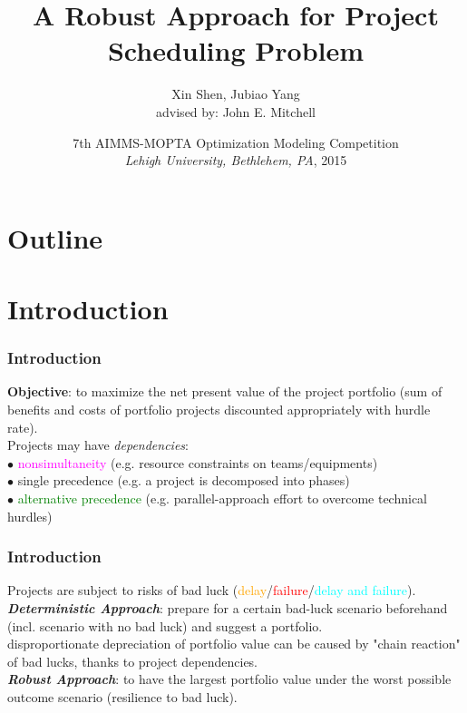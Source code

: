 \documentclass{beamer}
\title[Robust Scheduling]{A Robust Approach for Project Scheduling Problem}
\author[Shen, Yang]{Xin Shen, Jubiao Yang\\{\small advised by: John E. Mitchell}}
\institute[RPI]{ 
Rensselaer Polytechnic Institute  \\
Troy,  NY  12180}
\date[MOPTA 2015]{7th AIMMS-MOPTA Optimization Modeling Competition\\\textit{Lehigh University, Bethlehem, PA}, 2015}
\newcommand{\torange}{\textcolor{orange}}
\newcommand{\tred}{\textcolor{red}}
\newcommand{\tmag}{\textcolor{magenta}}
\newcommand{\tgreen}{\textcolor{green}}
\newcommand{\tcyan}{\textcolor{cyan}}
\newcommand{\tcam}{\textcolor{blue!40}}
\begin{document}
	

	\begin{frame}
		\titlepage
	\end{frame}

	\section*{Outline} 
		\begin{frame}[allowframebreaks]
			\tableofcontents 
		\end{frame}

	\section{Introduction}
		\begin{frame}
			\frametitle{Introduction}
			\textbf{Objective}: to maximize the net present value of the project portfolio (sum of benefits and costs of portfolio projects discounted appropriately with hurdle rate).\\
			\bigskip
			Projects may have \textit{dependencies}:\\
			\smallskip
			$\bullet$ \tmag{nonsimultaneity} (e.g. resource constraints on teams/equipments)\\
			\smallskip
			$\bullet$ \tcam{single precedence} (e.g. a project is decomposed into phases)\\
			\smallskip
			$\bullet$ \tgreen{alternative precedence} (e.g. parallel-approach effort to overcome technical hurdles)
		\end{frame}
		
		\begin{frame}
			\frametitle{Introduction}
			Projects are subject to risks of bad luck (\torange{delay}/\tred{failure}/\tcyan{delay and failure}).\\
			\bigskip
			\textbf{\textit{Deterministic Approach}}: prepare for a certain bad-luck scenario beforehand (incl. scenario with no bad luck) and suggest a portfolio.\\
			\smallskip
			disproportionate depreciation of portfolio value can be caused by "chain reaction" of bad lucks, thanks to project dependencies.\\
			\bigskip
			\textbf{\textit{Robust Approach}}: to have the largest portfolio value under the worst possible outcome scenario (resilience to bad luck).
		\end{frame}
\end{document}
